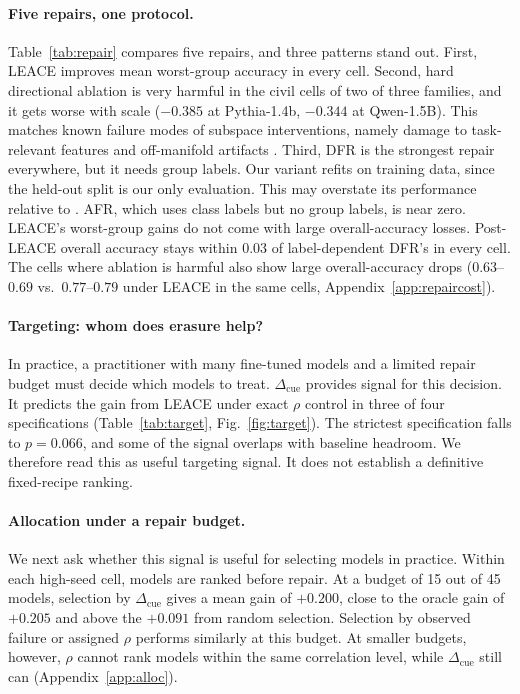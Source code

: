 \documentclass[11pt]{article}
\newcommand{\cued}{\ensuremath{\Delta_{\mathrm{cue}}}}
\begin{document}
\paragraph{Five repairs, one protocol.}
Table~\ref{tab:repair} compares five repairs, and three patterns stand out.
First, LEACE improves mean worst-group accuracy in every cell. Second, hard
directional ablation is very harmful in the civil cells of two of three
families, and it gets worse with scale ($-0.385$ at Pythia-1.4b, $-0.344$ at
Qwen-1.5B). This matches known failure modes of subspace interventions,
namely damage to task-relevant features \citep{kumar2022probing} and
off-manifold artifacts \citep{makelov2023illusion}. Third, DFR is the strongest repair everywhere, but it needs group labels. Our variant refits on training data, since the held-out split is our only evaluation. This may overstate its performance relative to \citet{kirichenko2023dfr}. AFR,
which uses class labels but no group labels, is near zero. LEACE's worst-group gains do not come with large overall-accuracy losses. Post-LEACE overall accuracy stays within $0.03$ of label-dependent DFR's in
every cell. The cells where ablation is harmful also show large
overall-accuracy drops ($0.63$--$0.69$ vs.\ $0.77$--$0.79$ under LEACE in the
same cells, Appendix~\ref{app:repaircost}).

\paragraph{Targeting: whom does erasure help?}
In practice, a practitioner with many fine-tuned models and a limited repair
budget must decide which models to treat. \cued{} provides signal for this
decision. It predicts the gain from LEACE under exact $\rho$ control in three
of four specifications (Table~\ref{tab:target}, Fig.~\ref{fig:target}).
The strictest specification falls to $p{=}0.066$, and some of the signal
overlaps with baseline headroom. We therefore read this as useful targeting signal. It does not establish a
definitive fixed-recipe ranking.

\paragraph{Allocation under a repair budget.}
We next ask whether this signal is useful for selecting models in practice.
Within each high-seed cell, models are ranked before repair. At a budget of
15 out of 45 models, selection by \cued{} gives a mean gain of $+0.200$, close
to the oracle gain of $+0.205$ and above the $+0.091$ from random selection.
Selection by observed failure or assigned $\rho$ performs similarly at this
budget. At smaller budgets, however, $\rho$ cannot rank models within the same
correlation level, while \cued{} still can
(Appendix~\ref{app:alloc}).
\end{document}

